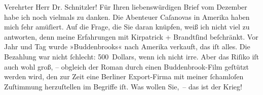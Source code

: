 \pstart{}Verehrter Herr Dr. Schnitzler!\pend\vspace{0.5em}
\pstart
           Für Ihren liebenswürdigen Brief vom Dezember habe ich noch vielmals zu
               danken. Die Abenteuer Caſanovas in Amerika haben mich{ }ſehr amüſiert. Auf
               die Frage, die Sie daran knüpfen, weiß ich nicht viel zu antworten, denn meine
               Erfahrungen mit Kirpatrick + Brandtſind beſchränkt. Vor Jahr und Tag wurde »Buddenbrooks« nach Amerika verkauft, das iſt alles. Die Bezahlung war nicht{ }ſchlecht:
               500 Dollars, wenn ich nicht irre. Aber das Riſiko iſt auch wohl groß, – obgleich der
               Roman durch einen Buddenbrook-Film geſtützt
               werden wird, den zur Zeit eine Berliner
               Export-Firma mit meiner{ }ſchamloſen Zuſtimmung {\pb}herzuſtellen im Begriffe iſt. Was wollen
               Sie, – das ist der Krieg!\pend
           
